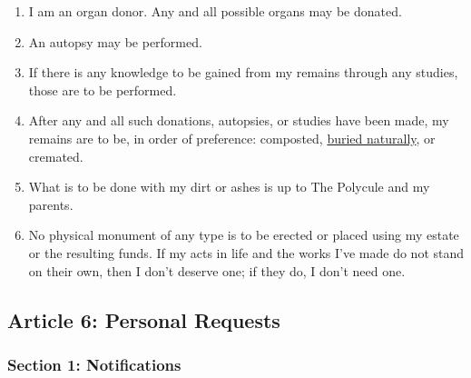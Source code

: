\begin{enumerate}
\def\labelenumi{\arabic{enumi}.}
\tightlist
\item
  I am an organ donor. Any and all possible organs may be donated.
\item
  An autopsy may be performed.
\item
  If there is any knowledge to be gained from my remains through any studies, those are to be performed.
\item
  After any and all such donations, autopsies, or studies have been made, my remains are to be, in order of preference: composted, \href{https://en.wikipedia.org/wiki/Natural_burial}{buried naturally}, or cremated.
\item
  What is to be done with my dirt or ashes is up to The Polycule and my parents.
\item
  No physical monument of any type is to be erected or placed using my estate or the resulting funds. If my acts in life and the works I've made do not stand on their own, then I don't deserve one; if they do, I don't need one.
\end{enumerate}

\hypertarget{article-6-personal-requests}{%
\subsection*{Article 6: Personal Requests}\label{article-6-personal-requests}}

\hypertarget{section-1-notifications}{%
\subsubsection*{Section 1: Notifications}\label{section-1-notifications}}

